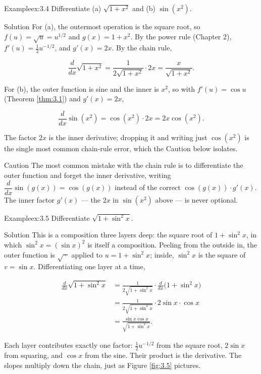 \documentclass[a4paper,12pt,oneside]{memoir}
\begin{document}
\begin{workedexample}
\begin{envexample}{Example}{ex:3.4}{}
Differentiate (a) \(\sqrt{1 + x^{2}}\) and (b) \(\sin(x^{2})\).
\end{envexample}
\begin{envsolution}{Solution}{}{}
For (a), the outermost operation is the square root, so \(f(u) = \sqrt{u} = u^{1/2}\) and \(g(x) = 1 + x^{2}\). By the power rule (Chapter 2), \(f'(u) = \tfrac12 u^{-1/2}\), and \(g'(x) = 2x\). By the chain rule,

\[ \frac{d}{dx}\sqrt{1 + x^{2}} = \frac{1}{2\sqrt{1 + x^{2}}}\cdot 2x = \frac{x}{\sqrt{1 + x^{2}}}. \]

For (b), the outer function is sine and the inner is \(x^{2}\), so with \(f'(u) = \cos u\) (Theorem \ref{thm:3.1}) and \(g'(x) = 2x\),

\[ \frac{d}{dx}\sin(x^{2}) = \cos(x^{2})\cdot 2x = 2x\cos(x^{2}). \]

The factor \(2x\) is the inner derivative; dropping it and writing just \(\cos(x^{2})\) is the single most common chain-rule error, which the Caution below isolates.
\end{envsolution}
\end{workedexample}
\begin{envcaution}{Caution}{}{}
The most common mistake with the chain rule is to differentiate the outer function and forget the inner derivative, writing \(\dfrac{d}{dx}\sin(g(x)) = \cos(g(x))\) instead of the correct \(\cos(g(x))\cdot g'(x)\). The inner factor \(g'(x)\) — the \(2x\) in \(\sin(x^{2})\) above — is never optional.
\end{envcaution}
\begin{workedexample}
\begin{envexample}{Example}{ex:3.5}{}
Differentiate \(\sqrt{1 + \sin^{2} x}\).
\end{envexample}
\begin{envsolution}{Solution}{}{}
This is a composition three layers deep: the square root of \(1 + \sin^{2} x\), in which \(\sin^{2} x = (\sin x)^{2}\) is itself a composition. Peeling from the outside in, the outer function is \(\sqrt{\,\cdot\,}\) applied to \(u = 1 + \sin^{2} x\); inside, \(\sin^{2} x\) is the square of \(v = \sin x\). Differentiating one layer at a time,

\[ \begin{aligned}
          \frac{d}{dx}\sqrt{1 + \sin^{2} x}
            &= \frac{1}{2\sqrt{1 + \sin^{2} x}}\cdot \frac{d}{dx}\bigl(1 + \sin^{2} x\bigr) \\[2pt]
            &= \frac{1}{2\sqrt{1 + \sin^{2} x}}\cdot 2\sin x\cdot \cos x \\[2pt]
            &= \frac{\sin x \cos x}{\sqrt{1 + \sin^{2} x}}.
        \end{aligned} \]

Each layer contributes exactly one factor: \(\tfrac12 u^{-1/2}\) from the square root, \(2\sin x\) from squaring, and \(\cos x\) from the sine. Their product is the derivative. The slopes multiply down the chain, just as Figure \ref{fig:3.5} pictures.
\end{envsolution}
\end{workedexample}
\end{document}
